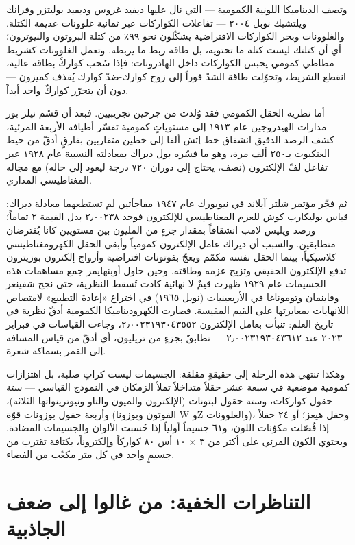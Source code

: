 \documentclass[12pt,a4paper,openany]{book}
\begin{document}
وتصف الديناميكا اللونية الكمومية — التي نال عليها ديفيد غروس وديفيد بوليتزر وفرانك ويلتشيك نوبل ٢٠٠٤ — تفاعلات الكواركات عبر ثمانية غلوونات عديمة الكتلة. والغلوونات وبحر الكواركات الافتراضية يشكّلون نحو ٩٩٪ من كتلة البروتون والنيوترون؛ أي أن كتلتك ليست كتلة ما تحتويه، بل طاقة ربط ما يربطه. وتعمل الغلوونات كشريط مطاطي كمومي يحبس الكواركات داخل الهادرونات: فإذا سُحب كواركٌ بطاقة عالية، انقطع الشريط، وتحوّلت طاقة الشدّ فوراً إلى زوج كوارك-ضدّ كوارك يُقذف كميزون — دون أن يتحرّر كواركٌ واحد أبداً.


أما نظرية الحقل الكمومي فقد وُلدت من جرحين تجريبيين. فبعد أن قسّم نيلز بور مدارات الهيدروجين عام ١٩١٣ إلى مستوياتٍ كمومية تفسّر أطيافه الأربعة المرئية، كشف الرصد الدقيق انشقاق خط إتش-ألفا إلى خطين متقاربين بفارقٍ أدقّ من خيط العنكبوت بـ٢٥٠ ألف مرة، وهو ما فسّره بول ديراك بمعادلته النسبية عام ١٩٢٨ عبر تفاعل لفّ الإلكترون (نصف، يحتاج إلى دوران ٧٢٠ درجة ليعود إلى حاله) مع مجاله المغناطيسي المداري.


ثم فجّر مؤتمر شلتر آيلاند في نيويورك عام ١٩٤٧ مفاجأتين لم تستطعهما معادلة ديراك: قياس بوليكارب كوش للعزم المغناطيسي للإلكترون فوجد ٢٫٠٠٢٣٨ بدل القيمة ٢ تماماً؛ ورصد ويليس لامب انشقاقاً بمقدار جزءٍ من المليون بين مستويين كانا يُفترضان متطابقين. والسبب أن ديراك عامل الإلكترون كمومياً وأبقى الحقل الكهرومغناطيسي كلاسيكياً، بينما الحقل نفسه مكمّم ويعجّ بفوتونات افتراضية وأزواج إلكترون-بوزيترون تدفع الإلكترون الحقيقي وتزيح عزمه وطاقته. وحين حاول أوبنهايمر جمع مساهمات هذه الجسيمات عام ١٩٢٩ ظهرت قيمٌ لا نهائية كادت تُسقط النظرية، حتى نجح شفينغر وفاينمان وتوموناغا في الأربعينيات (نوبل ١٩٦٥) في اختراع «إعادة التطبيع» لامتصاص اللانهايات بمعايرتها على القيم المقيسة. فصارت الكهروديناميكا الكمومية أدقّ نظرية في تاريخ العلم: تنبأت بعامل الإلكترون ٢٫٠٠٢٣١٩٣٠٤٣٥٥٢، وجاءت القياسات في فبراير ٢٠٢٣ عند ٢٫٠٠٢٣١٩٣٠٤٣٦١٢ — تطابقٌ بجزءٍ من تريليون، أي أدقّ من قياس المسافة إلى القمر بسماكة شعرة.


وهكذا تنتهي هذه الرحلة إلى حقيقةٍ مقلقة: الجسيمات ليست كراتٍ صلبة، بل اهتزازات كمومية موضعية في سبعة عشر حقلاً متداخلاً تملأ الزمكان في النموذج القياسي — ستة حقول كواركات، وستة حقول لبتونات (الإلكترون والميون والتاو ونيوترينواتها الثلاثة)، وأربعة حقول بوزونات قوّة (الفوتون وبوزونا W وZ والغلوونات)، وحقل هيغز؛ أو ٢٤ حقلاً إذا فُصّلت مكوّنات اللون، و٦١ جسيماً أولياً إذا حُسبت الألوان والجسيمات المضادة. ويحتوي الكون المرئي على أكثر من ٣ × ١٠ أس ٨٠ كواركاً وإلكتروناً، بكثافة تقترب من جسيمٍ واحد في كل متر مكعّب من الفضاء.


\chapter*{التناظرات الخفية: من غالوا إلى ضعف الجاذبية}
\end{document}
